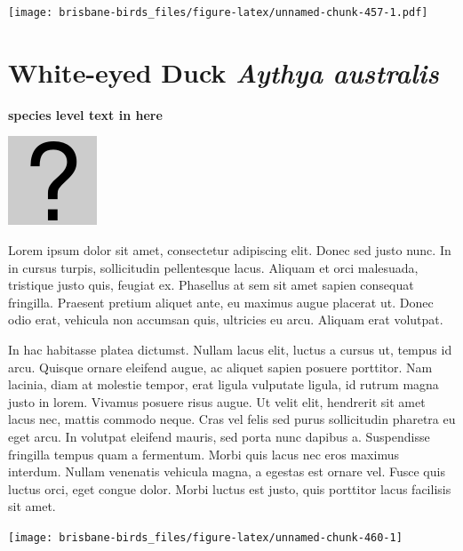 \documentclass[]{book}
\let\origfigure\figure
\let\endorigfigure\endfigure
\renewenvironment{figure}[1][2] {
  \expandafter\origfigure\expandafter[H]
} {
  \endorigfigure
}
\begin{document}
\begin{figure}
\centering
\texttt{[image: brisbane-birds\_files/figure-latex/unnamed-chunk-457-1.pdf]}
\caption{\label{fig:unnamed-chunk-457}insert figure caption}
\end{figure}

\section{\texorpdfstring{White-eyed Duck \emph{Aythya
australis}}{White-eyed Duck Aythya australis}}\label{white-eyed-duck-aythya-australis}

\textbf{species level text in here}

\begin{figure}
\centering
\includegraphics{assets/missing.png}
\caption{No image for species}
\end{figure}

Lorem ipsum dolor sit amet, consectetur adipiscing elit. Donec sed justo
nunc. In in cursus turpis, sollicitudin pellentesque lacus. Aliquam et
orci malesuada, tristique justo quis, feugiat ex. Phasellus at sem sit
amet sapien consequat fringilla. Praesent pretium aliquet ante, eu
maximus augue placerat ut. Donec odio erat, vehicula non accumsan quis,
ultricies eu arcu. Aliquam erat volutpat.

In hac habitasse platea dictumst. Nullam lacus elit, luctus a cursus ut,
tempus id arcu. Quisque ornare eleifend augue, ac aliquet sapien posuere
porttitor. Nam lacinia, diam at molestie tempor, erat ligula vulputate
ligula, id rutrum magna justo in lorem. Vivamus posuere risus augue. Ut
velit elit, hendrerit sit amet lacus nec, mattis commodo neque. Cras vel
felis sed purus sollicitudin pharetra eu eget arcu. In volutpat eleifend
mauris, sed porta nunc dapibus a. Suspendisse fringilla tempus quam a
fermentum. Morbi quis lacus nec eros maximus interdum. Nullam venenatis
vehicula magna, a egestas est ornare vel. Fusce quis luctus orci, eget
congue dolor. Morbi luctus est justo, quis porttitor lacus facilisis sit
amet.

\begin{figure}
\texttt{[image: brisbane-birds\_files/figure-latex/unnamed-chunk-460-1]} \caption{insert figure caption}\label{fig:unnamed-chunk-460}
\end{figure}
\end{document}
